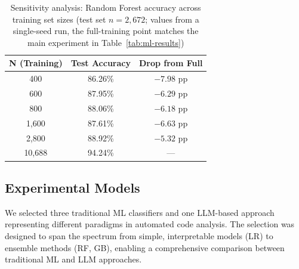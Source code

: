 \documentclass[acmsmall]{acmart}
\begin{document}
\begin{table}[htbp]
\centering
\caption{Sensitivity analysis: Random Forest accuracy across training set
sizes (test set $n=2{,}672$; values from a single-seed run, the full-training
point matches the main experiment in Table~\ref{tab:ml-results})}
\label{tab:sensitivity}
\begin{tabular}{@{}ccc@{}}
\toprule
N (Training) & Test Accuracy & Drop from Full \\
\midrule
400   & 86.26\% & $-7.98$ pp \\
600   & 87.95\% & $-6.29$ pp \\
800   & 88.06\% & $-6.18$ pp \\
1,600 & 87.61\% & $-6.63$ pp \\
2,800 & 88.92\% & $-5.32$ pp \\
10,688 & 94.24\% & --- \\
\bottomrule
\end{tabular}
\end{table}

\subsection{Experimental Models}

We selected three traditional ML classifiers and one LLM-based approach
representing different paradigms in automated code analysis. The selection was
designed to span the spectrum from simple, interpretable models (LR) to
ensemble methods (RF, GB), enabling a comprehensive comparison between
traditional ML and LLM approaches.
\end{document}
